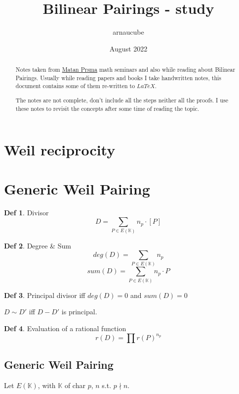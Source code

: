 \documentclass{article}
\title{Bilinear Pairings - study}
\author{arnaucube}
\date{August 2022}
\theoremstyle{definition}
\newtheorem{definition}{Def}[section]
\begin{document}
\maketitle

\begin{abstract}
  Notes taken from \href{https://sites.google.com/site/matanprasma/artifact}{Matan Prsma} math seminars and also while reading about Bilinear Pairings. Usually while reading papers and books I take handwritten notes, this document contains some of them re-written to $LaTeX$.

	The notes are not complete, don't include all the steps neither all the proofs. I use these notes to revisit the concepts after some time of reading the topic.
\end{abstract}

\tableofcontents

\section{Weil reciprocity}

\section{Generic Weil Pairing}

\begin{definition}{Divisor}
  $$D= \sum_{P \in E(\mathbb{K})} n_p \cdot [P]$$
\end{definition}

\begin{definition}{Degree \& Sum}
  $$deg(D)= \sum_{P \in E(\mathbb{K})} n_p$$
  $$sum(D)= \sum_{P \in E(\mathbb{K})} n_p \cdot P$$
\end{definition}

\begin{definition}{Principal divisor}
  iff $deg(D)=0$ and $sum(D)=0$
\end{definition}
$D \sim D'$ iff $D - D'$ is principal.


\begin{definition}{Evaluation of a rational function}
  $$r(D)= \prod r(P)^{n_p}$$
\end{definition}

\subsection{Generic Weil Pairing}
Let $E(\mathbb{K})$, with $\mathbb{K}$ of char $p$, $n$ s.t. $p \nmid n$.
\end{document}
